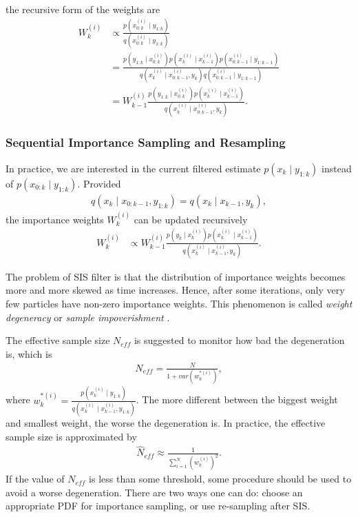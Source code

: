 the recursive form of the weights are
\begin{align*}
W_k^{(i)} &\propto \frac{p(x_{0:k}^{(i)}\mid y_{1:k})}{q(x_{0:k}^{(i)}\mid y_{1:k})}\\
&= \frac{ p(y_{1:k}\mid x_{0:k}^{(i)}) p(x_{k}^{(i)}\mid x_{k-1}^{(i)})  p(x_{0:k-1}^{(i)}\mid y_{1:k-1})}   { q(x_{k}^{(i)}\mid x_{0:k-1}^{(i)},y_{k})  q(x_{0:k-1}^{(i)}\mid y_{1:k-1}) } \\
&= W_{k-1}^{(i)} \frac{ p(y_{1:k}\mid x_{0:k}^{(i)}) p(x_{k}^{(i)}\mid x_{k-1}^{(i)}) }   {q(x_{k}^{(i)}\mid x_{0:k-1}^{(i)},y_{k})}.
\end{align*}

\subsubsection{Sequential Importance Sampling and Resampling}
 
In practice, we are interested in the current filtered estimate $p(x_k\mid y_{1:k})$ instead of $p(x_{0:k}\mid y_{1:k})$. Provided 
\begin{align*}
q(x_k\mid  x_{0:k-1},y_{1:k})=q(x_k\mid  x_{k-1},y_k),
\end{align*}
the importance weights $W_k^{(i)}$ can be updated recursively
\begin{align*}
W_k^{(i)} &\propto W_{k-1}^{(i)} \frac{ p(y_k\mid x_k^{(i)}) p(x_{k}^{(i)}\mid x_{k-1}^{(i)}) }   {q(x_{k}^{(i)}\mid x_{k-1}^{(i)},y_{k})}.
\end{align*}

The problem of SIS filter is that the distribution of importance weights becomes more and more skewed as time increases. Hence, after some iterations, only very few particles have non-zero importance weights. This phenomenon is called \textit{weight degeneracy} or \textit{sample impoverishment} \cite{smcmip2011}.

The effective sample size $N_{eff}$ is suggested to monitor how bad the degeneration is, which is
\begin{align*}
N_{eff}=\frac{N}{1+var(w_k^{*(i)})},
\end{align*}
where $w_k^{*(i)}=\frac{p(x_k^{(i)}\mid y_{1:k})}{q(x_k^{(i)}\mid x_{k-1}^{(i)},y_{1:k})}$. The more different between the biggest weight and smallest weight, the worse the degeneration is. In practice, the effective sample size is approximated by
\begin{align*}
\hat{N}_{eff}\approx \frac{1}{\sum_{i=1}^{N}(w_k^{(i)})^2}.
\end{align*}
If the value of $N_{eff}$ is less than some threshold, some procedure should be used to avoid a worse degeneration. There are two ways one can do: choose an appropriate PDF for importance sampling, or use re-sampling after SIS. 

